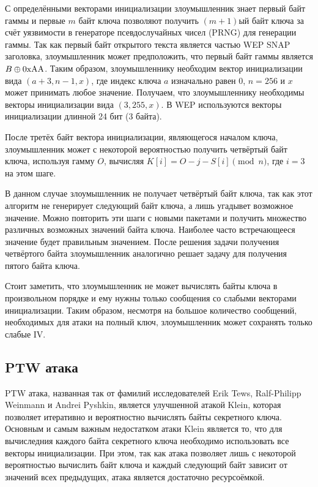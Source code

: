 С определёнными векторами инициализации злоумышленник знает первый байт гаммы и
первые $m$ байт ключа позволяют получить $(m+1)$ый байт ключа за счёт уязвимости
в генераторе псевдослучайных чисел (PRNG) для генерации гаммы. Так как первый
байт открытого текста является частью WEP SNAP заголовка, злоумышленник может
предположить, что первый байт гаммы является $B \oplus \text{0xAA}$. Таким образом,
злоумышленнику необходим вектор инициализации вида $(a+3, n-1, x)$, где индекс
ключа $a$ изначально равен $0$, $n=256$ и $x$ может принимать любое значение.
Получаем, что злоумышленнику необходимы векторы инициализации вида $(3, 255,
x)$. В WEP используются векторы инициализации длинной 24 бит (3 байта).

После третёх байт вектора инициализации, являющегося началом ключа, злоумышленник
может с некоторой вероятностью получить четвёртый байт ключа, используя гамму
$O$, вычисляя $K[i] = O-j-S[i]\pmod{n}$, где $i=3$ на этом шаге.

В данном случае злоумышленник не получает четвёртый байт ключа, так как этот
алгоритм не генерирует следующий байт ключа, а лишь угадывет возможное значение.
Можно повторить эти шаги с новыми пакетами и получить множество различных
возможных значений байта ключа. Наиболее часто встречающееся значение будет
правильным значением. После решения задачи получения четвёртого байта
злоумышленник аналогично решает задачу для получения пятого байта ключа.

Стоит заметить, что злоумышленник не может вычислять байты ключа в произвольном
порядке и ему нужны только сообщения со слабыми векторами инициализации. Таким
образом, несмотря на большое количество сообщений, необходимых для атаки на
полный ключ, злоумышленник может сохранять только слабые IV.

\subsection{PTW атака}

PTW атака, названная так от фамилий исследователей Erik Tews, Ralf-Philipp
Weinmann и Andrei Pyshkin, является улучшенной атакой Klein, которая
позволяет итеративно и вероятностно вычислять байты секретного ключа. Основным и
самым важным недостатком атаки Klein является то, что для вычиследния каждого
байта секретного ключа необходимо использовать все векторы инициализации. При
этом, так как атака позволяет лишь с некоторой вероятностью вычислить байт ключа
и каждый следующий байт зависит от значений всех предыдущих, атака является
достаточно ресурсоёмкой.

